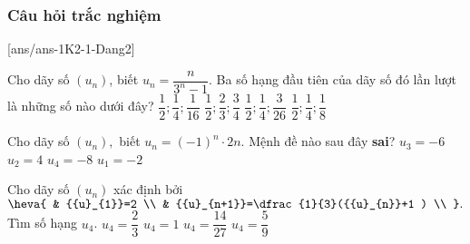 \subsubsection{Câu hỏi trắc nghiệm}
[ans/ans-1K2-1-Dang2]
\begin{ex}%
	Cho dãy số $({{u}_{n}} )$, biết ${{u}_{n}}=\dfrac{n}{{{3}^{n}}-1}$. Ba số hạng đầu tiên của dãy số đó lần lượt là những số nào dưới đây?
	\choice
	{$\dfrac{1}{2};\dfrac{1}{4};\dfrac{1}{16}$}
	{$\dfrac{1}{2};\dfrac{2}{3};\dfrac{3}{4}$}
	{ \True $\dfrac{1}{2};\dfrac{1}{4};\dfrac{3}{26}$}
	{$\dfrac{1}{2};\dfrac{1}{4};\dfrac{1}{8}$}
	
\end{ex}
\begin{ex}%
	Cho dãy số $({{u}_{n}} ),$ biết ${{u}_{n}}={{(-1 )}^{n}}\cdot 2n$. Mệnh đề nào sau đây {\bf sai}?
	\choice
	{${{u}_{3}}=-6$}
	{${{u}_{2}}=4$}
	{ \True ${{u}_{4}}=-8$}
	{${{u}_{1}}=-2$}
	
\end{ex}
\begin{ex}%
	Cho dãy số $({{u}_{n}} )$ xác định bởi $\heva{
		& {{u}_{1}}=2 \\
		& {{u}_{n+1}}=\dfrac{1}{3}({{u}_{n}}+1 ) \\
	}.$ Tìm số hạng ${{u}_{4}}$.
	\choice
	{${{u}_{4}}=\dfrac{2}{3}$}
	{${{u}_{4}}=1$}
	{${{u}_{4}}=\dfrac{14}{27}$}
	{ \True ${{u}_{4}}=\dfrac{5}{9}$}
\end{ex}

